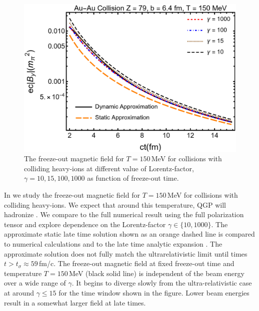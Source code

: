 \begin{figure}
\centering
\includegraphics[width=0.8\linewidth]{plots/bfgaamacomp.png}
    \caption{The freeze-out magnetic field for $T= 150$\,MeV for collisions with colliding heavy-ions at different value of Lorentz-factor, $\gamma=10,15,100,1000$ as function of freeze-out time.   \label{fig:bcolcomp}}
\end{figure}

In  we study the freeze-out magnetic field for $T= 150$\,MeV for collisions with colliding heavy-ions. We expect that around this temperature, QGP will hadronize \cite{Letessier:1992xd}.  We compare  to the full numerical result using the full polarization tensor  and explore dependence on the Lorentz-factor $\gamma\in\{10,1000\}$. The approximate static late time solution  shown as an orange dashed line is compared to numerical calculations  and to the late time analytic expansion . The approximate solution does not fully match the ultrarelativistic limit until times $t > t_{\sigma} \approx 59$\,fm/c. The freeze-out magnetic field at fixed freeze-out time and temperature $T= 150$\,MeV  (black solid line) is independent of the beam energy over a wide range of $\gamma$. It begins to diverge slowly from the ultra-relativistic case at around $\gamma \leq 15$ for the time window shown in the figure. Lower beam energies result in a somewhat larger field at late times.  

